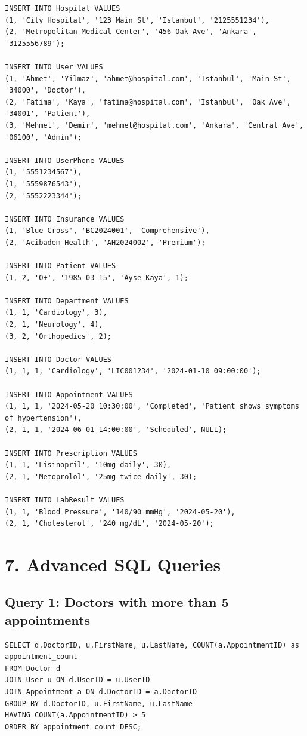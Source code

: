 \begin{verbatim}
INSERT INTO Hospital VALUES 
(1, 'City Hospital', '123 Main St', 'Istanbul', '2125551234'),
(2, 'Metropolitan Medical Center', '456 Oak Ave', 'Ankara', '3125556789');

INSERT INTO User VALUES 
(1, 'Ahmet', 'Yilmaz', 'ahmet@hospital.com', 'Istanbul', 'Main St', '34000', 'Doctor'),
(2, 'Fatima', 'Kaya', 'fatima@hospital.com', 'Istanbul', 'Oak Ave', '34001', 'Patient'),
(3, 'Mehmet', 'Demir', 'mehmet@hospital.com', 'Ankara', 'Central Ave', '06100', 'Admin');

INSERT INTO UserPhone VALUES 
(1, '5551234567'),
(1, '5559876543'),
(2, '5552223344');

INSERT INTO Insurance VALUES 
(1, 'Blue Cross', 'BC2024001', 'Comprehensive'),
(2, 'Acibadem Health', 'AH2024002', 'Premium');

INSERT INTO Patient VALUES 
(1, 2, 'O+', '1985-03-15', 'Ayse Kaya', 1);

INSERT INTO Department VALUES 
(1, 1, 'Cardiology', 3),
(2, 1, 'Neurology', 4),
(3, 2, 'Orthopedics', 2);

INSERT INTO Doctor VALUES 
(1, 1, 1, 'Cardiology', 'LIC001234', '2024-01-10 09:00:00');

INSERT INTO Appointment VALUES 
(1, 1, 1, '2024-05-20 10:30:00', 'Completed', 'Patient shows symptoms of hypertension'),
(2, 1, 1, '2024-06-01 14:00:00', 'Scheduled', NULL);

INSERT INTO Prescription VALUES 
(1, 1, 'Lisinopril', '10mg daily', 30),
(2, 1, 'Metoprolol', '25mg twice daily', 30);

INSERT INTO LabResult VALUES 
(1, 1, 'Blood Pressure', '140/90 mmHg', '2024-05-20'),
(2, 1, 'Cholesterol', '240 mg/dL', '2024-05-20');
\end{verbatim}

\newpage
\section*{7. Advanced SQL Queries}

\subsection*{Query 1: Doctors with more than 5 appointments}

\begin{verbatim}
SELECT d.DoctorID, u.FirstName, u.LastName, COUNT(a.AppointmentID) as appointment_count
FROM Doctor d
JOIN User u ON d.UserID = u.UserID
JOIN Appointment a ON d.DoctorID = a.DoctorID
GROUP BY d.DoctorID, u.FirstName, u.LastName
HAVING COUNT(a.AppointmentID) > 5
ORDER BY appointment_count DESC;
\end{verbatim}

